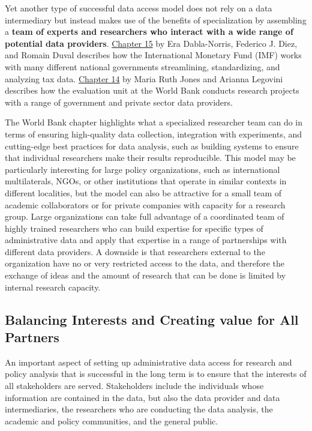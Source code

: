 Yet another type of successful data access model does not rely on a data intermediary but instead makes use of the benefits of specialization by assembling a \textbf{team of experts and researchers who interact with a wide range of potential data providers}. \protect\hyperlink{imf}{Chapter 15} by Era Dabla-Norris, Federico J. Diez, and Romain Duval describes how the International Monetary Fund (IMF) works with many different national governments streamlining, standardizing, and analyzing tax data. \protect\hyperlink{dime}{Chapter 14} by Maria Ruth Jones and Arianna Legovini describes how the evaluation unit at the World Bank conducts research projects with a range of government and private sector data providers.

The World Bank chapter highlights what a specialized researcher team can do in terms of ensuring high-quality data collection, integration with experiments, and cutting-edge best practices for data analysis, such as building systems to ensure that individual researchers make their results reproducible. This model may be particularly interesting for large policy organizations, such as international multilaterals, NGOs, or other institutions that operate in similar contexts in different localities, but the model can also be attractive for a small team of academic collaborators or for private companies with capacity for a research group. Large organizations can take full advantage of a coordinated team of highly trained researchers who can build expertise for specific types of administrative data and apply that expertise in a range of partnerships with different data providers. A downside is that researchers external to the organization have no or very restricted access to the data, and therefore the exchange of ideas and the amount of research that can be done is limited by internal research capacity.

\hypertarget{balancing-interests-and-creating-value-for-all-partners}{%
\subsection{Balancing Interests and Creating value for All Partners}\label{balancing-interests-and-creating-value-for-all-partners}}

An important aspect of setting up administrative data access for research and policy analysis that is successful in the long term is to ensure that the interests of all stakeholders are served. Stakeholders include the individuals whose information are contained in the data, but also the data provider and data intermediaries, the researchers who are conducting the data analysis, the academic and policy communities, and the general public.

